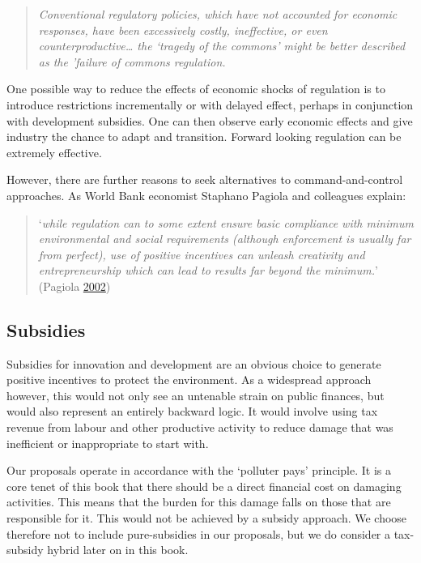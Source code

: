 \documentclass[]{tufte-handout}
\begin{document}
\begin{quote}
\emph{Conventional regulatory policies, which have not accounted for
economic responses, have been excessively costly, ineffective, or even
counterproductive\ldots{} the `tragedy of the commons' might be better
described as the 'failure of commons regulation.}
\end{quote}

One possible way to reduce the effects of economic shocks of regulation
is to introduce restrictions incrementally or with delayed effect,
perhaps in conjunction with development subsidies. One can then observe
early economic effects and give industry the chance to adapt and
transition. Forward looking regulation can be extremely effective.

However, there are further reasons to seek alternatives to
command-and-control approaches. As World Bank economist Staphano Pagiola
and colleagues explain:

\begin{quote}
`\emph{while regulation can to some extent ensure basic compliance with
minimum environmental and social requirements (although enforcement is
usually far from perfect), use of positive incentives can unleash
creativity and entrepreneurship which can lead to results far beyond the
minimum.}' (Pagiola \protect\hyperlink{ref-Pagiola2002}{2002})
\end{quote}

\hypertarget{subsidies}{%
\subsection{Subsidies}\label{subsidies}}

Subsidies for innovation and development are an obvious choice to
generate positive incentives to protect the environment. As a widespread
approach however, this would not only see an untenable strain on public
finances, but would also represent an entirely backward logic. It would
involve using tax revenue from labour and other productive activity to
reduce damage that was inefficient or inappropriate to start with.

Our proposals operate in accordance with the `polluter pays' principle.
It is a core tenet of this book that there should be a direct financial
cost on damaging activities. This means that the burden for this damage
falls on those that are responsible for it. This would not be achieved
by a subsidy approach. We choose therefore not to include pure-subsidies
in our proposals, but we do consider a tax-subsidy hybrid later on in
this book.
\end{document}
